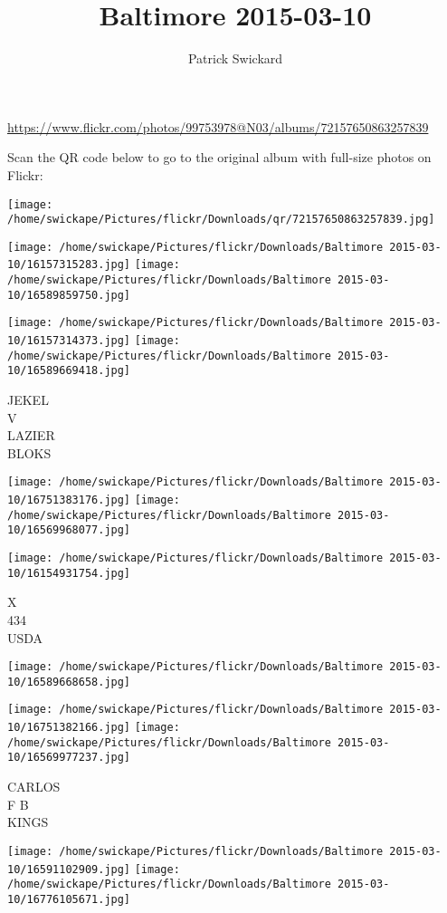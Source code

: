 \documentclass[10pt,letterpaper]{article}
\title{Baltimore 2015-03-10}
\author{Patrick Swickard}
\date{}
\begin{document}
\maketitle

\url{https://www.flickr.com/photos/99753978@N03/albums/72157650863257839}

Scan the QR code below to go to the original album with full-size photos on Flickr:

\texttt{[image: /home/swickape/Pictures/flickr/Downloads/qr/72157650863257839.jpg]}
\pagebreak

\texttt{[image: /home/swickape/Pictures/flickr/Downloads/Baltimore 2015-03-10/16157315283.jpg]}
\texttt{[image: /home/swickape/Pictures/flickr/Downloads/Baltimore 2015-03-10/16589859750.jpg]}

\texttt{[image: /home/swickape/Pictures/flickr/Downloads/Baltimore 2015-03-10/16157314373.jpg]}
\texttt{[image: /home/swickape/Pictures/flickr/Downloads/Baltimore 2015-03-10/16589669418.jpg]}

JEKEL\\
V\\
LAZIER\\
BLOKS
\pagebreak

\texttt{[image: /home/swickape/Pictures/flickr/Downloads/Baltimore 2015-03-10/16751383176.jpg]}
\texttt{[image: /home/swickape/Pictures/flickr/Downloads/Baltimore 2015-03-10/16569968077.jpg]}

\texttt{[image: /home/swickape/Pictures/flickr/Downloads/Baltimore 2015-03-10/16154931754.jpg]}

X\\
434\\
USDA
\pagebreak

\texttt{[image: /home/swickape/Pictures/flickr/Downloads/Baltimore 2015-03-10/16589668658.jpg]}

\vspace{0.25in}
\texttt{[image: /home/swickape/Pictures/flickr/Downloads/Baltimore 2015-03-10/16751382166.jpg]}
\texttt{[image: /home/swickape/Pictures/flickr/Downloads/Baltimore 2015-03-10/16569977237.jpg]}

CARLOS\\
F B\\
KINGS
\pagebreak

\texttt{[image: /home/swickape/Pictures/flickr/Downloads/Baltimore 2015-03-10/16591102909.jpg]}
\texttt{[image: /home/swickape/Pictures/flickr/Downloads/Baltimore 2015-03-10/16776105671.jpg]}
\end{document}
